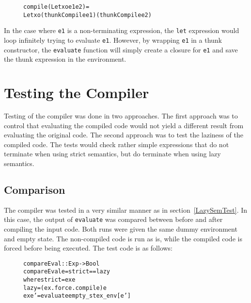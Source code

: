 \begin{figure}[!ht]
\begin{alltt}
compile (Let xo e1 e2) =
  Let xo (thunkCompile e1) (thunkCompile e2)
\end{alltt}
\end{figure}

\noindent In the case where \texttt{e1} is a non-terminating expression,
the \texttt{let} expression would loop infinitely trying to evaluate
\texttt{e1}. However, by wrapping \texttt{e1} in a thunk constructor, the
\texttt{evaluate} function will simply create a closure for \texttt{e1} and save
the thunk expression in the environment.

\section{Testing the Compiler}

Testing of the compiler was done in two approaches. The first approach was to
control that evaluating the compiled code would not yield a different result
from evaluating the original code. The second approach was to test the laziness
of the compiled code. The tests would check rather simple expressions that do
not terminate when using strict semantics, but do terminate when using lazy
semantics.

\subsection{Comparison}

The compiler was tested in a very similar manner as in
section~\ref{LazySemTest}. In this case, the output of \texttt{evaluate}
was compared between
before and after compiling the input code. Both runs were given the same
dummy environment and empty state. The non-compiled code is run as is, while
the compiled code is forced before being executed.
The test code is as follows:

\begin{figure}[!ht]
\begin{alltt}
compareEval :: Exp -> Bool
compareEval e = strict == lazy
  where strict = ex e
        lazy   = (ex . force . compile) e
        ex e'  = evaluate empty_st ex_env [e']
\end{alltt}
\end{figure}

